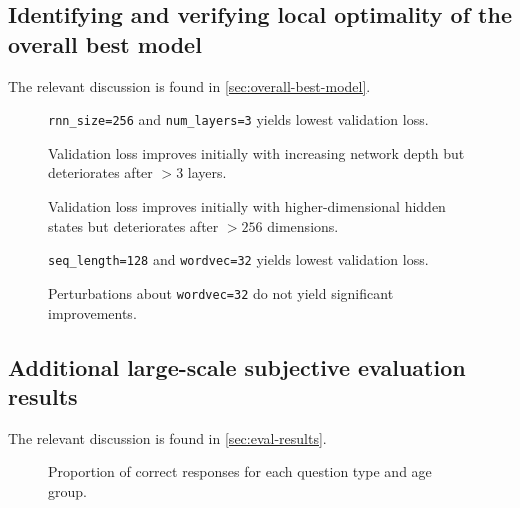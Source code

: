 \subsection{Identifying and verifying local optimality of the overall best model}

The relevant discussion is found in \vref{sec:overall-best-model}.

\begin{center}
  \label{tab:torch-rnn-config-perfs}
  
  \addtocounter{table}{-1}%
\end{center}

\begin{figure}[htbp]
    \centering
    
    \caption{\texttt{rnn\_size=256} and \texttt{num\_layers=3} yields lowest validation loss.}
    \label{fig:torch-rnn-network-params}
\end{figure}

\begin{figure}[htbp]
  \centering
  
  \caption{Validation loss improves initially with increasing network depth but deteriorates after $>3$ layers.}
  \label{fig:torch-rnn-network-params-num-layers}
\end{figure}

\begin{figure}[htbp]
  \centering
  
  \caption{Validation loss improves initially with higher-dimensional hidden states
  but deteriorates after $>256$ dimensions.}
  \label{fig:torch-rnn-network-params-rnn-size}
\end{figure}

\begin{figure}[htbp]
    \centering
    
    \caption{\texttt{seq\_length=128} and \texttt{wordvec=32} yields lowest validation loss.}
    \label{fig:torch-rnn-input-params}
\end{figure}

\begin{figure}[htbp]
  \centering
  
  \caption{Perturbations about \texttt{wordvec=32} do not yield significant improvements.}
  \label{fig:torch-rnn-input-params-wordvec}
\end{figure}

\subsection{Additional large-scale subjective evaluation results}

The relevant discussion is found in \vref{sec:eval-results}.

\begin{figure}[htbp]
  \centering
  
  \caption{Proportion of correct responses for each question type and age group.}
  \label{fig:responses-mask-agegroup}
\end{figure}

